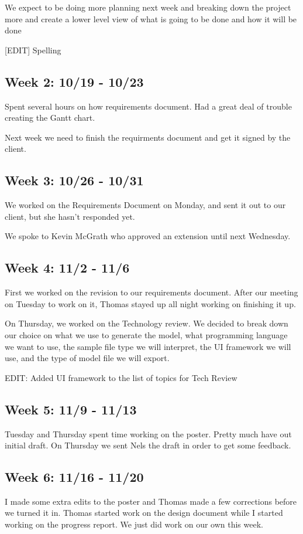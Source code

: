 \documentclass[letterpaper,10pt, onecolumn, draftclsnofoot]{IEEEtran}
\begin{document}
We expect to be doing more planning next week and breaking down the project more and create a lower level view of what is going to be done and how it will be done

[EDIT] Spelling

\subsection{Week 2: 10/19 - 10/23}
Spent several hours on how requirements document. Had a great deal of trouble creating the Gantt chart. 

Next week we need to finish the requirments document and get it signed by the client.

\subsection{Week 3: 10/26 - 10/31}
We worked on the Requirements Document on Monday, and sent it out to our client, but she hasn't responded yet. 

We spoke to Kevin McGrath who approved an extension until next Wednesday.

\subsection{Week 4: 11/2 - 11/6}
First we worked on the revision to our requirements document. After our meeting on Tuesday to work on it, Thomas stayed up all night working on finishing it up.

On Thursday, we worked on the Technology review. We decided to break down our choice on what we use to generate the model, what programming language we want to use, the sample file type we will interpret, the UI framework we will use, and the type of model file we will export. 

EDIT: Added UI framework to the list of topics for Tech Review

\subsection{Week 5: 11/9 - 11/13}
Tuesday and Thursday spent time working on the poster. Pretty much have out initial draft. On Thursday we sent Nels the draft in order to get some feedback.

\subsection{Week 6: 11/16 - 11/20}
I made some extra edits to the poster and Thomas made a few corrections before we turned it in. Thomas started work on the design document while I started working on the progress report. We just did work on our own this week.
\end{document}
